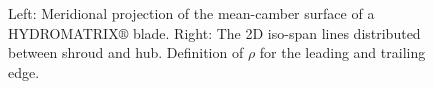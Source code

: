 \begin{figure}[h!]
\begin{minipage}[b]{0.5\linewidth}
 \centering
\end{minipage}
\begin{minipage}[b]{0.5\linewidth}
 \centering
\end{minipage}
\caption{Left: Meridional projection of the mean-camber surface of a HYDROMATRIX$\circledR$ blade. Right: The 2D iso-span lines distributed between shroud and hub. Definition of $\rho$ for the leading and trailing edge.}
\label{param1}
\end{figure}
 

